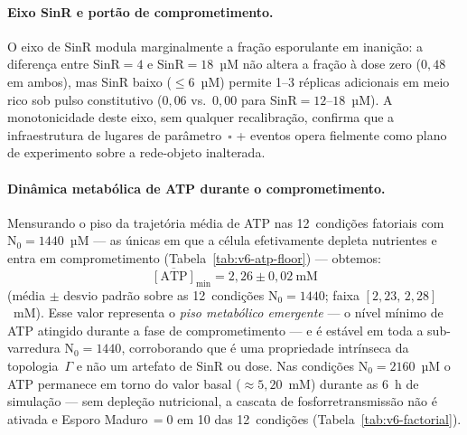 \paragraph{Eixo SinR e portão de comprometimento.}
O eixo de SinR modula marginalmente a fração esporulante em inanição: a
diferença entre SinR$=4$ e SinR$=18$~µM não altera a fração à dose zero
($0{,}48$ em ambos), mas SinR baixo ($\leq 6$~µM) permite 1--3 réplicas
adicionais em meio rico sob pulso constitutivo ($0{,}06$ vs.\ $0{,}00$
para SinR$=12$--$18$~µM).
A monotonicidade deste eixo, sem qualquer recalibração, confirma que a
infraestrutura de lugares de parâmetro~$\square$ + eventos opera
fielmente como plano de experimento sobre a rede-objeto inalterada.

\paragraph{Dinâmica metabólica de ATP durante o comprometimento.}
Mensurando o piso da trajetória média de ATP nas 12~condições
fatoriais com $\text{N}_0=1440$~µM --- as únicas em que a célula
efetivamente depleta nutrientes e entra em comprometimento
(Tabela~\ref{tab:v6-atp-floor}) ---
obtemos:
\begin{equation}
\overline{[\text{ATP}]}_{\min} = 2{,}26 \pm 0{,}02\ \text{mM}
\end{equation}
(média $\pm$ desvio padrão sobre as 12~condições $\text{N}_0=1440$;
faixa $[2{,}23,\,2{,}28]$~mM).
Esse valor representa o \emph{piso metabólico emergente} --- o nível
mínimo de ATP atingido durante a fase de comprometimento ---
e é estável em toda a sub-varredura $\text{N}_0=1440$,
corroborando que é uma propriedade intrínseca da topologia~$\Gamma$
e não um artefato de SinR ou dose.
Nas condições $\text{N}_0=2160$~µM o ATP permanece em torno do
valor basal ($\approx 5{,}20$~mM) durante as 6~h de simulação --- sem
depleção nutricional, a cascata de fosforretransmissão não é ativada
e Esporo Maduro$\,=0$ em 10 das 12~condições (Tabela~\ref{tab:v6-factorial}).

